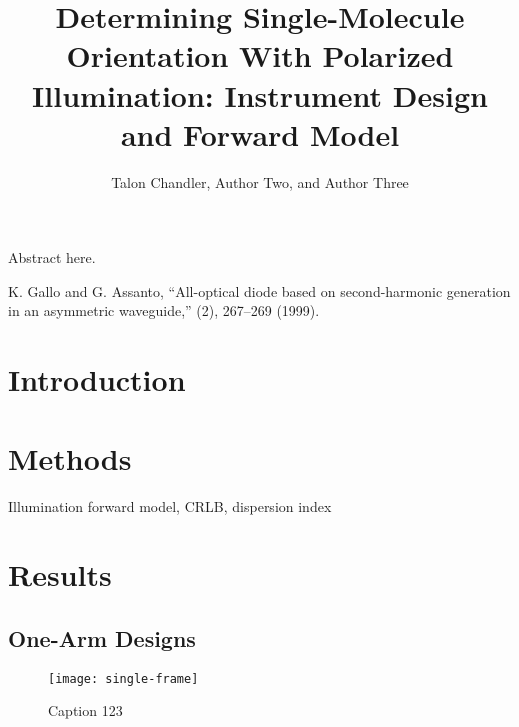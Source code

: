 \documentclass[10pt]{article}
\begin{document}
\title{Determining Single-Molecule Orientation With Polarized Illumination:
  Instrument Design and Forward Model}

\author{Talon Chandler, Author Two, and Author Three}

\address{Peer Review, Publications Department, The Optical Society, 2010 Massachusetts Avenue NW, Washington, DC 20036, USA\\
Publications Department, The Optical Society, 2010 Massachusetts Avenue NW, Washington, DC 20036, USA\\
Currently with the Department of Electronic Journals, The Optical Society, 2010 Massachusetts Avenue NW, Washington, DC 20036, USA}


\begin{abstract*}
Abstract here. 
\end{abstract*}


\begin{thebibliography}{99}
 K. Gallo and G. Assanto, ``All-optical diode based on second-harmonic generation in an asymmetric waveguide,'' (2), 267--269 (1999).
\end{thebibliography}

\section{Introduction}

\section{Methods}
Illumination forward model, CRLB, dispersion index

\section{Results}
\subsection{One-Arm Designs}
\begin{figure}[htbp]
\centering\texttt{[image: single-frame]}
\caption{Caption 123}
\end{figure}
\end{document}
